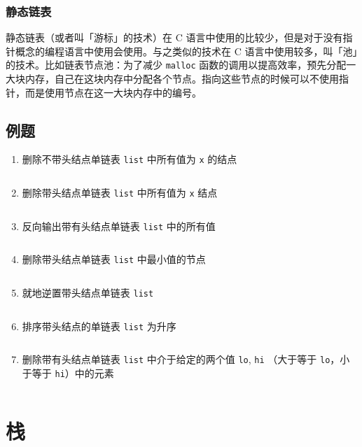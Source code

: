 \documentclass{ctexart}
\begin{document}
\subsubsection{静态链表}
静态链表（或者叫「游标」的技术）在 C 语言中使用的比较少，但是对于没有指针概念的编程语言中使用会使用。与之类似的技术在 C 语言中使用较多，叫「池」的技术。比如链表节点池：为了减少 \texttt{malloc} 函数的调用以提高效率，预先分配一大块内存，自己在这块内存中分配各个节点。指向这些节点的时候可以不使用指针，而是使用节点在这一大块内存中的编号。

\subsection{例题}
\begin{enumerate}
    \item 删除不带头结点单链表 \texttt{list} 中所有值为 \texttt{x} 的结点
        \inputminted{c}{codes/delete-all-x-from-list.c}

    \item 删除带头结点单链表 \texttt{list} 中所有值为 \texttt{x} 结点
        \inputminted{c}{codes/delete-all-x-from-list2.c}

    \item 反向输出带有头结点单链表 \texttt{list} 中的所有值
        \inputminted{c}{codes/print-a-list-revsersely.c}

    \item 删除带头结点单链表 \texttt{list} 中最小值的节点
        \inputminted{c}{codes/delete-minimal-value-from-list.c}

    \item 就地逆置带头结点单链表 \texttt{list}
        \inputminted{c}{codes/reverse-list-in-place.c}

    \item 排序带头结点的单链表 \texttt{list} 为升序
        \inputminted{c}{codes/sort-list.c}

    \item 删除带有头结点单链表 \texttt{list} 中介于给定的两个值 \texttt{lo}, \texttt{hi} （大于等于 \texttt{lo}，小于等于 \texttt{hi}）中的元素
        \inputminted{c}{codes/delete-values-between-lo-hi-from-list.c}
\end{enumerate}

\section{栈}
\end{document}
